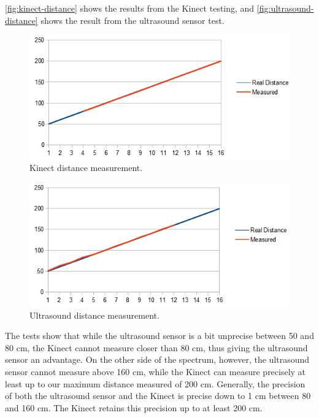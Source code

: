 \autoref{fig:kinect-distance} shows the results from the Kinect testing, and \autoref{fig:ultrasound-distance} shows the result from the ultrasound sensor test.

\begin{figure}[hbtp]
\includegraphics[width=\textwidth]{img/kinect-distance.png}
\caption{Kinect distance measurement.} 
\label{fig:kinect-distance} 
\end{figure}

\begin{figure}[hbtp]
\includegraphics[width=\textwidth]{img/ultrasound-distance.png}
\caption{Ultrasound distance measurement.} 
\label{fig:ultrasound-distance} 
\end{figure}

The tests show that while the ultrasound sensor is a bit unprecise between 50 and 80 cm, the Kinect cannot measure closer than 80 cm, thus giving the ultrasound sensor an advantage.
On the other side of the spectrum, however, the ultrasound sensor cannot measure above 160 cm, while the Kinect can measure precisely at least up to our maximum distance measured of 200 cm.
Generally, the precision of both the ultrasound sensor and the Kinect is precise down to \textpm{} 1 cm between 80 and 160 cm. The Kinect retains this precision up to at least 200 cm.

